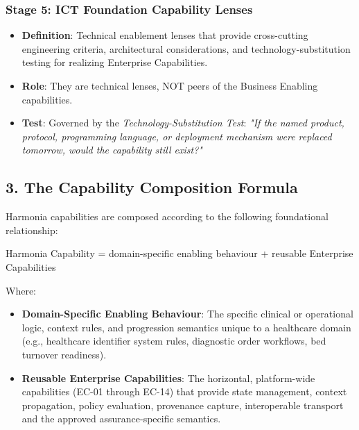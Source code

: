\subsubsection*{Stage 5: ICT Foundation Capability Lenses}
\label{rad:tier-model:138}

\begin{itemize}

\item
\textbf{Definition}: Technical enablement lenses that provide cross-cutting engineering criteria, architectural considerations, and technology-substitution testing for realizing Enterprise Capabilities.



\item
\textbf{Role}: They are technical lenses, NOT peers of the Business Enabling capabilities.



\item
\textbf{Test}: Governed by the \emph{Technology-Substitution Test}: \emph{"If the named product, protocol, programming language, or deployment mechanism were replaced tomorrow, would the capability still exist?"}



\end{itemize}
\label{rad:tier-model:142}

\par\smallskip
{}\label{rad:tier-model:144}
\subsection*{3. The Capability Composition Formula}
\label{rad:tier-model:146}

Harmonia capabilities are composed according to the following foundational relationship:

\label{rad:tier-model:148}

 Harmonia Capability = domain-specific enabling behaviour + reusable Enterprise Capabilities

\label{rad:tier-model:150}

Where:

\label{rad:tier-model:151}

\begin{itemize}

\item
\textbf{Domain-Specific Enabling Behaviour}: The specific clinical or operational logic, context rules, and progression semantics unique to a healthcare domain (e.g., healthcare identifier system rules, diagnostic order workflows, bed turnover readiness).



\item
\textbf{Reusable Enterprise Capabilities}: The horizontal, platform-wide capabilities (EC-01 through EC-14) that provide state management, context propagation, policy evaluation, provenance capture, interoperable transport and the approved assurance-specific semantics.



\end{itemize}
\label{rad:tier-model:154}
